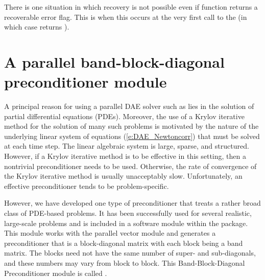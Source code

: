 {{  There is one situation in which recovery is not possible even if 
  function returns a recoverable error flag.  This is when this occurs at the very
  first call to the  (in which case {\idas} returns
  ).
}


\section{A parallel band-block-diagonal preconditioner module}\label{sss:idabbdpre}

A principal reason for using a parallel DAE solver such as {\idas} lies
in the solution of partial differential equations (PDEs).  Moreover,
the use of a Krylov iterative method for the solution of many such
problems is motivated by the nature of the underlying linear system of
equations (\ref{e:DAE_Newtoncorr}) that must be solved at each time step.  The
linear algebraic system is large, sparse, and structured. However, if
a Krylov iterative method is to be effective in this setting, then a
nontrivial preconditioner needs to be used.  Otherwise, the rate of
convergence of the Krylov iterative method is usually unacceptably
slow.  Unfortunately, an effective preconditioner tends to be
problem-specific.

However, we have developed one type of preconditioner that treats a
rather broad class of PDE-based problems.  It has been successfully
used for several realistic, large-scale problems \cite{HiTa:98} and is
included in a software module within the {\idas} package. This module
works with the parallel vector module {\nvecp} and
generates a preconditioner that is a block-diagonal matrix with each
block being a band matrix. The blocks need not have the same number of
super- and sub-diagonals, and these numbers may vary from block to
block. This Band-Block-Diagonal Preconditioner module is called
{\idabbdpre}.

}
